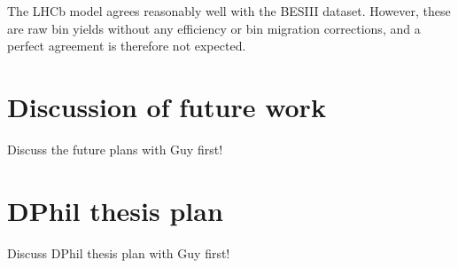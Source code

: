 \documentclass[12pt, a4paper, notitlepage, onecolumn]{article}
\numberwithin{equation}{section}
\begin{document}
The LHCb model agrees reasonably well with the BESIII dataset. However, these are raw bin yields without any efficiency or bin migration corrections, and a perfect agreement is therefore not expected.


\section{Discussion of future work}
\noindent Discuss the future plans with Guy first!





\newpage
\section{DPhil thesis plan}
\noindent Discuss DPhil thesis plan with Guy first!
\end{document}
